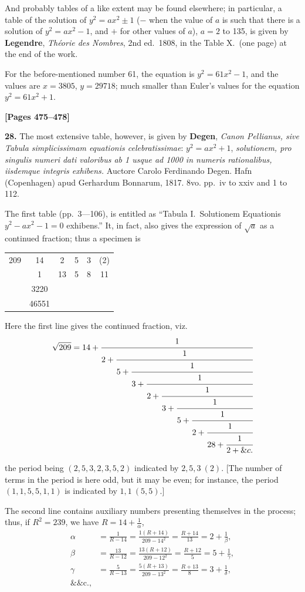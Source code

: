 \documentclass[11pt,a4paper]{article}
\begin{document}
And probably tables of a like extent may be found elsewhere; in particular, a table of the solution
of $y^{2} = ax^{2} \pm 1$ ($-$ when the value of $a$ is such that there is a solution of $y^{2} = ax^{2} - 1$,
and $+$ for other values of $a$), $a = 2$ to 135, is given by
\quad\textbf{Legendre}, \textit{Th\' eorie des Nombres}, 2nd ed.\ 1808, in the Table X.\ (one page) at the end of the work.

For the before-mentioned number 61, the equation is $y^{2} = 61x^{2} - 1$,
and the values are $x = 3805$, $y = 29718$; much smaller than Euler's values for the equation $y^{2} = 61x^{2} + 1$.


\newpage
\textbf{[Pages 475--478]}

\textbf{28.} The most extensive table, however, is given by
\quad\textbf{Degen}, \textit{Canon Pellianus, sive Tabula simplicissimam equationis celebratissimae}:
$y^{2} = ax^{2} + 1$, \textit{solutionem, pro singulis numeri dati valoribus ab 1 usque ad 1000 in numeris rationalibus, iisdemque integris exhibens.}
Auctore Carolo Ferdinando Degen. Hafn (Copenhagen) apud Gerhardum Bonnarum, 1817. 8vo. pp.\ iv to xxiv and 1 to 112.

The first table (pp.\ 3---106), is entitled as ``Tabula I.\ Solutionem Equationis $y^{2} - ax^{2} - 1 = 0$ exhibens.''
It, in fact, also gives the expression of $\sqrt{a}$ as a continued fraction; thus a specimen is
\begin{center}\begin{tabular}{c|ccccc}209 & 14 & 2 & 5 & 3 & (2) \\
 & 1 & 13 & 5 & 8 & 11 \\
 & 3220 & & & & \\
 & 46551 & & & & \\
\end{tabular}\end{center}

Here the first line gives the continued fraction, viz.
\[\sqrt{209} = 14 + \cfrac{1}{2 + \cfrac{1}{5 + \cfrac{1}{3 + \cfrac{1}{2 + \cfrac{1}{3 + \cfrac{1}{5 + \cfrac{1}{2 + \cfrac{1}{28 + \cfrac{1}{2 + \&c.}}}}}}}}}\]

the period being $(2, 5, 3, 2, 3, 5, 2)$ indicated by $2, 5, 3\ (2)$. [The number of terms in the period
is here odd, but it may be even; for instance, the period $(1, 1, 5, 5, 1, 1)$ is indicated by $1, 1\ (5, 5)$.]

The second line contains auxiliary numbers presenting themselves in the process;
thus, if $R^{2} = 239$, we have $R = 14 + \frac{1}{\alpha}$,
\begin{align*}
\alpha &= \frac{1}{R-14} = \frac{1(R+14)}{209-14^{2}} = \frac{R+14}{13} = 2 + \frac{1}{\beta}, \\
\beta &= \frac{13}{R-12} = \frac{13(R+12)}{209-12^{2}} = \frac{R+12}{5} = 5 + \frac{1}{\gamma}, \\
\gamma &= \frac{5}{R-13} = \frac{5(R+13)}{209-13^{2}} = \frac{R+13}{8} = 3 + \frac{1}{\delta}, \\
\&\text{\&c.,}
\end{align*}
\end{document}
